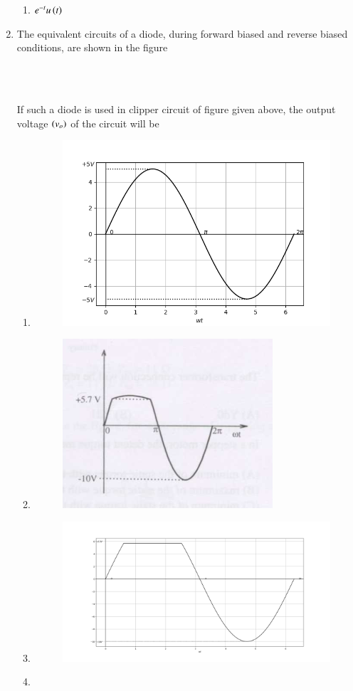 \documentclass[journal]{IEEEtran}
\begin{document}
\begin{enumerate}
\begin{enumerate}
    \item $e^{-t}u\left(t\right)$ \\
\end{enumerate}
\item The equivalent circuits of a diode, during forward biased and reverse biased conditions, are shown in the figure
\begin{figure}[!ht]
\centering
\resizebox{0.5\textwidth}{!}{%

}%
\end{figure}\\
\begin{figure}[!ht]
\centering
\resizebox{0.5\textwidth}{!}{%

}%
\end{figure}
\\
If such a diode is used in clipper circuit of figure given above, the output voltage $\left(v_o\right)$ of the circuit will be 
 \begin{enumerate}
     \item \begin{figure}[h!]
   \includegraphics[width=0.3\linewidth]{figs/A8.1.png}
   \end{figure}
     \item \begin{figure}[h!]
   \includegraphics[width=0.25\linewidth]{figs/A8.2.png}
   \end{figure}
     \item \begin{figure}[h!]
   \includegraphics[width=0.3\linewidth]{figs/A8.3.png}
   \end{figure}
     \item \begin{figure}[h!]

\end{figure}
\end{enumerate}
\end{enumerate}
\end{document}
